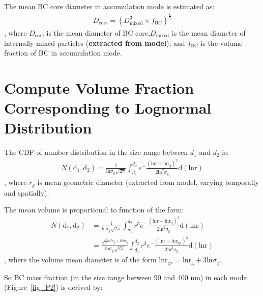 \documentclass[11pt]{article}
\begin{document}
\noindent The mean BC core diameter in accumulation mode is estimated as:
\begin{align*}
D_{\text{core}} = (D_{\text{mixed}}^3 \times f_{\text{BC}})^\frac{1}{3} 
\end{align*}
, where $D_{\text{core}}$ is the mean diameter of BC core,$D_{\text{mixed}}$ is the mean diameter of internally mixed particles (\textbf{extracted from model}), and $f_{\text{BC}}$ is the volume fraction of BC in accumulation mode.



 
\section{Compute Volume Fraction Corresponding to Lognormal Distribution}

The CDF of number distribution in the size range between $d_{1}$ and $d_{2}$ is:
\begin{align*}
N(\text{d}_{1}, \text{d}_{2}) = \frac{1}{\text{ln}\sigma_{\text{g}}\sqrt{2\pi}}\int_{d_{1}}^{d_{2}}e^-\frac{(\text{lnr} - \text{lnr}_{g})^2}{2\text{ln}^2\sigma_{\text{g}}}\text{d}(\text{lnr})
\end{align*}
, where $r_{g}$ is mean geometric diameter (extracted from model, varying temporally and spatially). 

\noindent The mean volume is proportional to function of the form:
\begin{align*}
N(\text{d}_{1}, \text{d}_{2}) &= \frac{1}{\text{ln}\sigma_{\text{g}}\sqrt{2\pi}}\int_{d_{1}}^{d_{2}}r^3e^-\frac{(\text{lnr} - \text{lnr}_{g})^2}{2\text{ln}^2\sigma_{\text{g}}}\text{d}(\text{lnr})  \\
&=\frac{e^{\frac{k^2}{2}ln^2\sigma_{g}+klnr_{g}}}{\text{ln}\sigma_{\text{g}}\sqrt{2\pi}}\int_{d_{1}}^{d_{2}}r^3e^-\frac{(\text{lnr} - \text{lnr}_{\text{gv}})^2}{2\text{ln}^2\sigma_{\text{g}}}\text{d}(\text{lnr})
\end{align*}
, where the volume mean diameter is of the form $\text{lnr}_{\text{gv}} = \text{lnr}_{\text{g}} + 3\text{ln}\sigma_{\text{g}}$.

\noindent So BC mass fraction (in the size range between 90 and 400 nm) in each mode (Figure~\ref{fig_P2}) is derived by:
\end{document}
